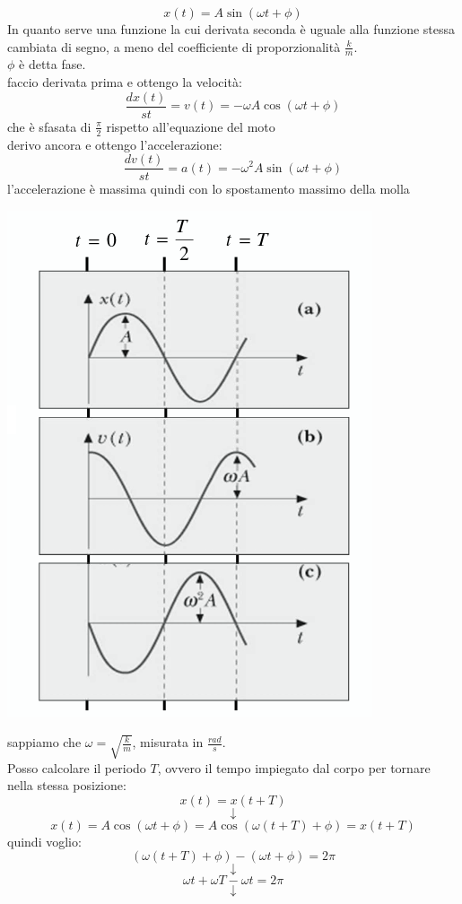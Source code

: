 \documentclass[a4paper,12pt, oneside]{book}
\begin{document}
$$x(t)=A\sin(\omega t+\phi)$$
In quanto serve una funzione la cui derivata seconda è uguale alla funzione stessa cambiata di segno, a meno del coefficiente di proporzionalità $\frac{k}{m}$.\\
$\phi$ è detta fase.
\\faccio derivata prima e ottengo la velocità:
$$\frac{dx(t)}{st}=v(t)=-\omega A\cos(\omega t+\phi)$$
che è sfasata di $\frac{\pi}{2}$ rispetto all'equazione del moto
\\derivo ancora e ottengo l'accelerazione:
$$\frac{dv(t)}{st}=a(t)=-\omega^2A\sin(\omega t+\phi)$$
l'accelerazione è massima quindi con lo spostamento massimo della molla
\begin{center}
	\includegraphics[scale=0.7]{img/arm.png}
\end{center}
sappiamo che $\omega=\sqrt{\frac{k}{m}}$, misurata in $\frac{rad}{s}$.
\\Posso calcolare il periodo $T$, ovvero il tempo impiegato dal corpo per tornare nella stessa posizione:
$$x(t)=x(t+T)$$
$$\downarrow$$
$$x(t)=A\cos(\omega t+\phi)=A\cos(\omega (t+T)+\phi)=x(t+T)$$
quindi voglio:
$$(\omega(t+T)+\phi)-(\omega t+\phi)=2\pi$$
$$\downarrow$$
$$\omega t+\omega T-\omega t= 2\pi$$
$$\downarrow$$
\end{document}
